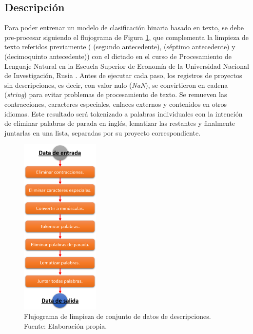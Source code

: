 \subsection{Descripción}
Para poder entrenar un modelo de clasificación binaria basado en texto, se debe pre-procesar siguiendo el flujograma de Figura \ref{4:fig32}, que complementa la limpieza de texto referidos previamente (\citeauthor{pr_mitra2014phrases} (segundo antecedente), \citeauthor{pr_yuan2016textanalytics} (séptimo antecedente) y \citeauthor{pr_chen2019keywords_crowdfunding} (decimoquinto antecedente)) con el dictado en el curso de Procesamiento de Lenguaje Natural en la Escuela Superior de Economía de la Universidad Nacional de Investigación, Rusia \parencite{tec_zimovnov2018text_preprocessing}. Antes de ejecutar cada paso, los registros de proyectos sin descripciones, es decir, con valor nulo (\textit{NaN}), se convirtieron en cadena (\textit{string}) para evitar problemas de procesamiento de texto. Se remueven las contracciones, caracteres especiales, enlaces externos y contenidos en otros idiomas. Este resultado será tokenizado a palabras individuales con la intención de eliminar palabras de parada en inglés, lematizar las restantes y finalmente juntarlas en una lista, separadas por su proyecto correspondiente.

\begin{figure}[!ht]
	\begin{center}
		\includegraphics[width=0.35\textwidth]{4/figures/description_data_clean.png}
		\caption{Flujograma de limpieza de conjunto de datos de descripciones. Fuente: Elaboración propia.}
		\label{4:fig32}
	\end{center}
\end{figure}

